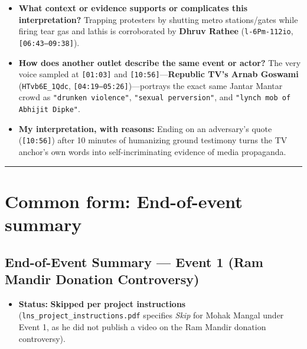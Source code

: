 \documentclass[10pt,a4paper]{article}
\begin{document}
\begin{itemize}[leftmargin=1.5em, itemsep=3pt, topsep=4pt]
  \item \textbf{What context or evidence supports or complicates this interpretation?} Trapping protesters by shutting metro stations/gates while firing tear gas and lathis is corroborated by \textbf{Dhruv Rathee} (\texttt{l-6Pm-112io}, \texttt{[06:43--09:38]}).
  \item \textbf{How does another outlet describe the same event or actor?} The very voice sampled at \texttt{[01:03]} and \texttt{[10:56]}---\textbf{Republic TV's Arnab Goswami} (\texttt{HTvb6E\_1Qdc}, \texttt{[04:19--05:26]})---portrays the exact same Jantar Mantar crowd as \texttt{"drunken violence"}, \texttt{"sexual perversion"}, and \texttt{"lynch mob of Abhijit Dipke"}.
  \item \textbf{My interpretation, with reasons:} Ending on an adversary's quote (\texttt{[10:56]}) after 10 minutes of humanizing ground testimony turns the TV anchor's own words into self-incriminating evidence of media propaganda.
\end{itemize}
\vspace{4pt}\noindent\rule{\textwidth}{0.4pt}\vspace{4pt}

\section*{Common form: End-of-event summary}

\subsection*{End-of-Event Summary --- Event 1 (Ram Mandir Donation Controversy)}
\begin{itemize}[leftmargin=1.5em, itemsep=3pt, topsep=4pt]
  \item \textbf{Status:} \textbf{Skipped per project instructions} (\texttt{lns\_project\_instructions.pdf} specifies \textit{Skip} for Mohak Mangal under Event 1, as he did not publish a video on the Ram Mandir donation controversy).
\end{itemize}
\end{document}
